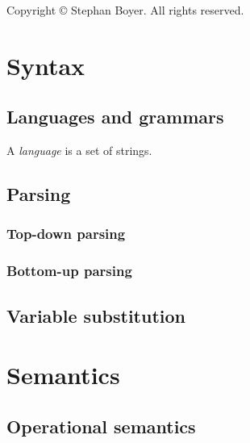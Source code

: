 \documentclass[ebook,oneside]{memoir} %
\title{\booktitle}
\author{Stephan Boyer}
\date{}
\begin{document}
  \frontmatter

    

    \pagebreak
    \hspace{0pt}
    \vfill
      \begin{center}
        Copyright \copyright{} \the\year{} Stephan Boyer. All rights reserved.
      \end{center}
    \vfill
    \hspace{0pt}
    \pagebreak

    

    \cleardoublepage
    \tableofcontents

  \mainmatter

    \part{Syntax}

      \chapter{Languages and grammars}

        A \emph{language} is a set of strings.

      \chapter{Parsing}

        \section{Top-down parsing}

        \section{Bottom-up parsing}

      \chapter{Variable substitution}

    \part{Semantics}

      \chapter{Operational semantics}
\end{document}
